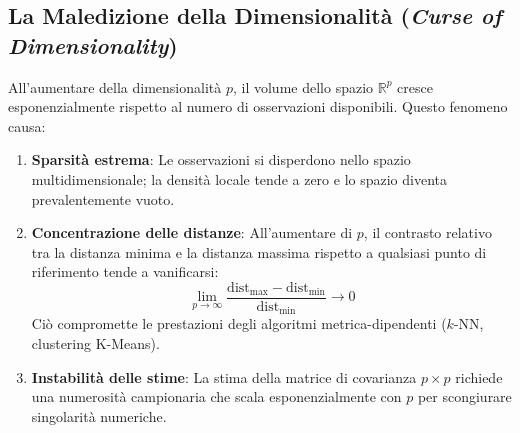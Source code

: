 \FloatBarrier
\subsection{La Maledizione della Dimensionalità (\textit{Curse of Dimensionality})}
\label{subsec:dm-curse-of-dimensionality}

All'aumentare della dimensionalità $p$, il volume dello spazio $\mathbb{R}^p$ cresce esponenzialmente rispetto al numero di osservazioni disponibili. Questo fenomeno causa:
\begin{enumerate}
    \item \textbf{Sparsità estrema}: Le osservazioni si disperdono nello spazio multidimensionale; la densità locale tende a zero e lo spazio diventa prevalentemente vuoto.
    \item \textbf{Concentrazione delle distanze}: All'aumentare di $p$, il contrasto relativo tra la distanza minima e la distanza massima rispetto a qualsiasi punto di riferimento tende a vanificarsi:
    \begin{equation}
        \lim_{p \to \infty} \frac{\mathrm{dist}_{\max} - \mathrm{dist}_{\min}}{\mathrm{dist}_{\min}} \to 0
    \end{equation}
    Ciò compromette le prestazioni degli algoritmi metrica-dipendenti ($k$-NN, clustering K-Means).
    \item \textbf{Instabilità delle stime}: La stima della matrice di covarianza $p \times p$ richiede una numerosità campionaria che scala esponenzialmente con $p$ per scongiurare singolarità numeriche.
\end{enumerate}

